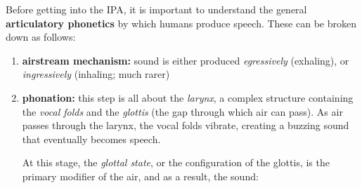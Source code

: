 \documentclass[12pt]{article}
\begin{document}
Before getting into the IPA, it is important to understand the general \textbf{articulatory phonetics} by which humans produce speech. These can be broken down as follows:

\begin{enumerate}
  \item \textbf{airstream mechanism:} sound is either produced \textit{egressively} (exhaling), or \textit{ingressively} (inhaling; much rarer)
  \item \textbf{phonation:} this step is all about the \textit{larynx}, a complex structure containing the \textit{vocal folds} and the \textit{glottis} (the gap through which air can pass). As air passes through the larynx, the vocal folds vibrate, creating a buzzing sound that eventually becomes speech.
  
  At this stage, the \textit{glottal state}, or the configuration of the glottis, is the primary modifier of the air, and as a result, the sound:


\end{enumerate}
\end{document}
